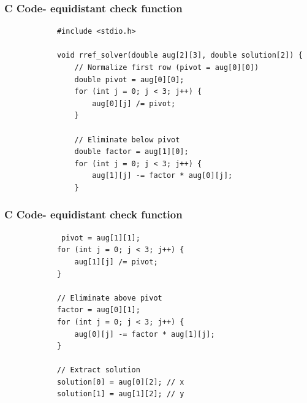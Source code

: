 \documentclass{beamer}
\begin{document}
	\begin{frame}[fragile]
		\frametitle{C Code- equidistant check function }
		
		\begin{lstlisting}
			#include <stdio.h>
			
			void rref_solver(double aug[2][3], double solution[2]) {
				// Normalize first row (pivot = aug[0][0])
				double pivot = aug[0][0];
				for (int j = 0; j < 3; j++) {
					aug[0][j] /= pivot;
				}
				
				// Eliminate below pivot
				double factor = aug[1][0];
				for (int j = 0; j < 3; j++) {
					aug[1][j] -= factor * aug[0][j];
				}
		\end{lstlisting}
	\end{frame}
	\begin{frame}[fragile]
		\frametitle{C Code- equidistant check function }
		
		\begin{lstlisting}
			 pivot = aug[1][1];
			for (int j = 0; j < 3; j++) {
				aug[1][j] /= pivot;
			}
			
			// Eliminate above pivot
			factor = aug[0][1];
			for (int j = 0; j < 3; j++) {
				aug[0][j] -= factor * aug[1][j];
			}
			
			// Extract solution
			solution[0] = aug[0][2]; // x
			solution[1] = aug[1][2]; // y
			
		\end{lstlisting}
	\end{frame}
\end{document}
